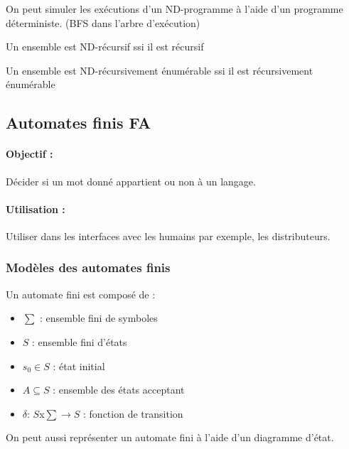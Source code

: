 \begin{myprop}
	On peut simuler les exécutions d'un ND-programme à l'aide d'un programme 
	déterministe. (BFS dans l'arbre d'exécution)
\end{myprop}

\begin{myprop}
	Un ensemble est ND-récursif ssi il est récursif
\end{myprop}

\begin{myprop}
	Un ensemble est ND-récursivement énumérable ssi il est récursivement 
	énumérable
\end{myprop}

\subsection{Automates finis FA}
\label{sub:automates_finis}

\paragraph{Objectif :} Décider si un mot donné appartient ou non à un langage.

\paragraph{Utilisation :} Utiliser dans les interfaces avec les humains par 
exemple, les distributeurs.

\subsubsection{Modèles des automates finis}
\label{ssub:mod_les_des_automates_finis}
Un automate fini est composé de :

\begin{itemize}
	\item $\sum$ : ensemble fini de symboles
	\item $S$ : ensemble fini d'états
	\item $s_0 \in S$ : état initial
	\item $A \subseteq S$ : ensemble des états acceptant
	\item $\delta$: $S$x$\sum \rightarrow S$ : fonction de transition
\end{itemize}

\begin{myrem}
	On peut aussi représenter un automate fini à l'aide d'un diagramme 
	d'état.
\end{myrem}

